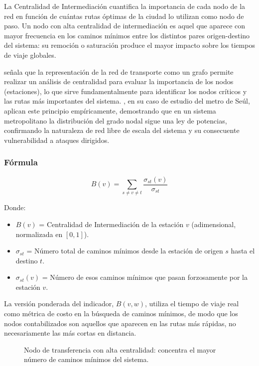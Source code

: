 La Centralidad de Intermediación cuantifica la importancia de cada nodo de la red
en función de cuántas rutas óptimas de la ciudad lo utilizan como nodo de paso.
Un nodo con alta centralidad de intermediación es aquel que aparece con mayor
frecuencia en los caminos mínimos entre los distintos pares origen-destino del
sistema: su remoción o saturación produce el mayor impacto sobre los tiempos de
viaje globales.

\textcite{allauca2023} señala que la representación de la red de transporte como un
grafo permite realizar un análisis de centralidad para evaluar la importancia de los
nodos (estaciones), lo que sirve fundamentalmente para identificar los nodos críticos
y las rutas más importantes del sistema. \textcite{lee2008}, en su caso de estudio
del metro de Seúl, aplican este principio empíricamente, demostrando que en un
sistema metropolitano la distribución del grado nodal sigue una ley de potencias,
confirmando la naturaleza de red libre de escala del sistema y su consecuente
vulnerabilidad a ataques dirigidos.

\subsubsection{Fórmula}

\begin{equation}
    B(v) = \sum_{s \neq v \neq t} \frac{\sigma_{st}(v)}{\sigma_{st}}
    \label{eq:betweenness}
\end{equation}

Donde:
\begin{itemize}
    \item $B(v)$ = Centralidad de Intermediación de la estación $v$ (adimensional,
    normalizada en $[0, 1]$).
    \item $\sigma_{st}$ = Número total de caminos mínimos desde la estación de
    origen $s$ hasta el destino $t$.
    \item $\sigma_{st}(v)$ = Número de esos caminos mínimos que pasan
    forzosamente por la estación $v$.
\end{itemize}

La versión ponderada del indicador, $B(v, w)$, utiliza el tiempo de viaje real como
métrica de costo en la búsqueda de caminos mínimos, de modo que los nodos
contabilizados son aquellos que aparecen en las rutas más rápidas, no
necesariamente las más cortas en distancia.


\begin{figure}[H]
    \centering
    \caption[Diagrama de Centralidad de Intermediación $B(v)$]{Nodo de
    transferencia con alta centralidad: concentra el mayor número de caminos
    mínimos del sistema.}
    \label{fig:indicador-Bv}
\end{figure}


